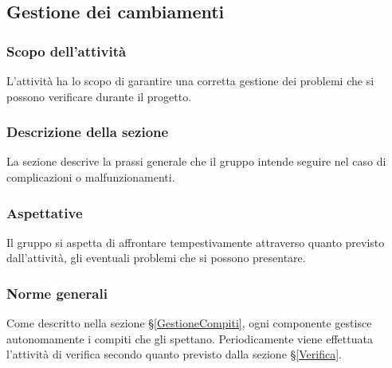 \subsection{Gestione dei cambiamenti}\label{GestioneCambiamenti}
\subsubsection{Scopo dell'attività} 
L'attività ha lo scopo di garantire una corretta gestione dei problemi che si possono verificare durante il progetto.
\subsubsection{Descrizione della sezione} 
La sezione descrive la prassi generale che il gruppo intende seguire nel caso di complicazioni o malfunzionamenti.
\subsubsection{Aspettative}
Il gruppo si aspetta di affrontare tempestivamente attraverso quanto previsto dall'attività, gli eventuali problemi che si possono presentare.
\subsubsection{Norme generali}
Come descritto nella sezione \S\ref{GestioneCompiti}, ogni componente gestisce autonomamente i compiti che gli spettano. Periodicamente viene effettuata l'attività di verifica secondo quanto previsto dalla sezione \S\ref{Verifica}.